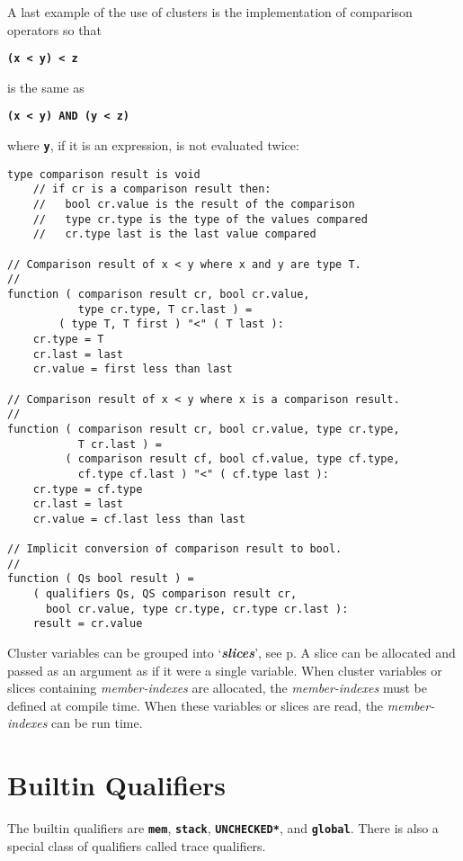 \documentclass[12pt]{article}
\newcommand{\TT}[1]{{\tt \bfseries #1}}
\newcommand{\skey}[2]{{\bf \em #1#2}\index{#1}}
\newcommand{\pagref}[1]{p\pageref{#1}}
\newenvironment{indpar}[1][0.3in]%
	{\begin{list}{}%
		     {\setlength{\itemsep}{0in}%
		      \setlength{\topsep}{0in}%
		      \setlength{\parsep}{1ex}%
		      \setlength{\labelwidth}{#1}%
		      \setlength{\leftmargin}{#1}%
		      \addtolength{\leftmargin}{\labelsep}}%
	 \item}%
	{\end{list}}
\begin{document}
A last example of the use of clusters is the implementation of
comparison operators so that
\begin{center}
\TT{(x~<~y)~<~z}
\end{center}
is the same as
\begin{center}
\TT{(x~<~y) AND (y~<~z)}
\end{center}
where \TT{y}, if it is an expression,
is not evaluated twice:\label{COMPARISON-RESULTS}
\begin{indpar}\begin{verbatim}
type comparison result is void
    // if cr is a comparison result then:
    //   bool cr.value is the result of the comparison
    //   type cr.type is the type of the values compared
    //   cr.type last is the last value compared

// Comparison result of x < y where x and y are type T.
//
function ( comparison result cr, bool cr.value,
           type cr.type, T cr.last ) =
        ( type T, T first ) "<" ( T last ):
    cr.type = T
    cr.last = last
    cr.value = first less than last

// Comparison result of x < y where x is a comparison result.
//
function ( comparison result cr, bool cr.value, type cr.type,
           T cr.last ) =
         ( comparison result cf, bool cf.value, type cf.type,
           cf.type cf.last ) "<" ( cf.type last ):
    cr.type = cf.type
    cr.last = last
    cr.value = cf.last less than last

// Implicit conversion of comparison result to bool.
//
function ( Qs bool result ) =
    ( qualifiers Qs, QS comparison result cr,
      bool cr.value, type cr.type, cr.type cr.last ):
    result = cr.value
\end{verbatim}\end{indpar}

Cluster variables can be grouped into `\skey{slice}s', see
\pagref{SLICE}.  A slice can be allocated and passed
as an argument as if it were a single variable.  When cluster
variables or slices containing {\em member-indexes} are allocated,
the {\em member-indexes} must be defined at compile time.
When these variables or slices are read, the
{\em member-indexes} can be run time.

\section{Builtin Qualifiers}
\label{BUILTIN-QUALIFIERS}

The builtin qualifiers are \TT{mem}, \TT{stack}, \TT{*UNCHECKED*},
and \TT{global}.
There is also a special class of qualifiers called trace qualifiers.
\end{document}
